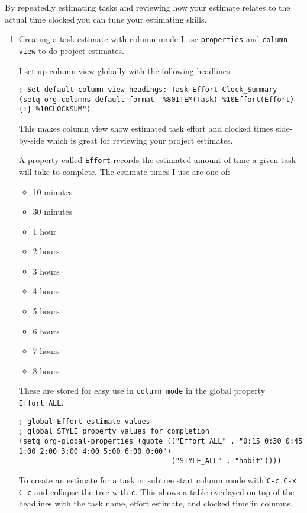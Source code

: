 \documentclass[11pt]{scrartcl}
\begin{document}
By repeatedly estimating tasks and reviewing how your estimate relates
to the actual time clocked you can tune your estimating skills.
\begin{enumerate}
\item Creating a task estimate with column mode
\label{sec:orgheadline24}
I use \texttt{properties} and \texttt{column view} to do project estimates.

I set up column view globally with the following headlines
\begin{verbatim}
; Set default column view headings: Task Effort Clock_Summary
(setq org-columns-default-format "%80ITEM(Task) %10Effort(Effort){:} %10CLOCKSUM")
\end{verbatim}

This makes column view show estimated task effort and clocked times
side-by-side which is great for reviewing your project estimates.

A property called \texttt{Effort} records the estimated amount of time a
given task will take to complete.  The estimate times I use are one
of:

\begin{itemize}
\item 10 minutes
\item 30 minutes
\item 1 hour
\item 2 hours
\item 3 hours
\item 4 hours
\item 5 hours
\item 6 hours
\item 7 hours
\item 8 hours
\end{itemize}

These are stored for easy use in \texttt{column mode} in the global property
\texttt{Effort\_ALL}.
\begin{verbatim}
; global Effort estimate values
; global STYLE property values for completion
(setq org-global-properties (quote (("Effort_ALL" . "0:15 0:30 0:45 1:00 2:00 3:00 4:00 5:00 6:00 0:00")
                                    ("STYLE_ALL" . "habit"))))
\end{verbatim}

To create an estimate for a task or subtree start column mode with
\texttt{C-c C-x C-c} and collapse the tree with \texttt{c}.  This shows a table
overlayed on top of the headlines with the task name, effort estimate,
and clocked time in columns.


\end{enumerate}
\end{document}
